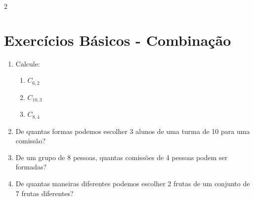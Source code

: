 \documentclass[11pt]{article}
\begin{document}
\begin{multicols}{2}
\begin{enumerate}[leftmargin=*, start=9]
\end{enumerate}

\section*{Exercícios Básicos - Combinação}

\begin{enumerate}[leftmargin=*, start=12]

\item Calcule:
\begin{enumerate}[label=\alph*)]
\item $C_{6,2}$
\item $C_{10,3}$
\item $C_{8,4}$
\end{enumerate}

\item De quantas formas podemos escolher 3 alunos de uma turma de 10 para uma comissão?

\item De um grupo de 8 pessoas, quantas comissões de 4 pessoas podem ser formadas?

\item De quantas maneiras diferentes podemos escolher 2 frutas de um conjunto de 7 frutas diferentes?

\end{enumerate}

\end{multicols}
\end{document}
